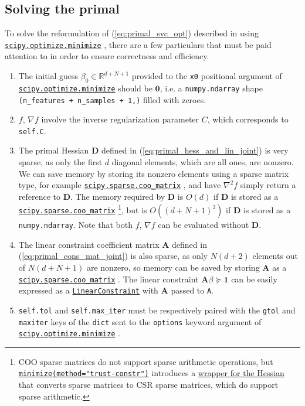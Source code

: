 \documentclass{article}
\numberwithin{equation}{section}
\newcommand{\minimize}{%
    \href{%
        https://docs.scipy.org/doc/scipy/reference/generated/%
        scipy.optimize.minimize.html%
    }{\texttt{scipy.optimize.minimize}}%
}
\newcommand{\minimizetrustconstr}{%
    \href{%
        https://docs.scipy.org/doc/scipy/reference/optimize.%
        minimize-trustconstr.html%
    }{\texttt{minimize(method="trust-constr")}}%
}
\newcommand{\coomatrix}{%
    \href{%
        https://docs.scipy.org/doc/scipy/reference/generated/%
        scipy.sparse.coo_matrix.html%
    }{\texttt{scipy.sparse.coo\_matrix}}%
}
\newcommand{\LinearConstraint}{%
    \href{%
        https://docs.scipy.org/doc/scipy/reference/generated/%
        scipy.optimize.LinearConstraint.html%
    }{\texttt{LinearConstraint}}%
}
\begin{document}
\subsection{Solving the primal}

To solve the reformulation of (\ref{eq:primal_svc_opt}) described in
 using \minimize, there are a few particulars that
must be paid attention to in order to ensure correctness and efficiency.

\medskip

\begin{enumerate}
    \item
    The initial guess $ \beta_0 \in \mathbb{R}^{d + N + 1} $ provided to the
    \texttt{x0} positional argument of \minimize{} should be $ \mathbf{0} $,
    i.e. a \texttt{numpy.ndarray} shape
    \texttt{(n\_features + n\_samples + 1,)} filled with zeroes.

    \item
    $ f $, $ \nabla f $ involve the inverse regularization parameter $ C $,
    which corresponds to \texttt{self.C}.

    \item
    The primal Hessian $ \mathbf{D} $ defined in
    (\ref{eq:primal_hess_and_lin_joint}) is very sparse, as only the first
    $ d $ diagonal elements, which are all ones, are nonzero. We can save
    memory by storing its nonzero elements using a sparse matrix type, for
    example \coomatrix, and have $ \nabla^2 f $ simply return a reference to
    $ \mathbf{D} $. The memory required by $ \mathbf{D} $ is $ O(d) $ if
    $ \mathbf{D} $ is stored as a \coomatrix\footnote{
        COO sparse matrices do not support sparse arithmetic
        operations, but \minimizetrustconstr{} introduces a \href{%
            https://github.com/scipy/scipy/blob/master/scipy/optimize/%
            _differentiable_functions.py\#L162-L185%
        }{wrapper for the Hessian} that converts sparse matrices to CSR
        sparse matrices, which do support sparse arithmetic.
    }, but is $ O((d + N + 1)^2) $ if $ \mathbf{D} $ is stored as a
    \texttt{numpy.ndarray}. Note that both $ f $, $ \nabla f $ can be
    evaluated without $ \mathbf{D} $.

    \item
    The linear constraint coefficient matrix $ \mathbf{A} $ defined in
    (\ref{eq:primal_cons_mat_joint}) is also sparse, as only $ N(d + 2) $
    elements out of $ N(d + N + 1) $ are nonzero, so memory can be saved by
    storing $ \mathbf{A} $ as a \coomatrix. The linear constraint
    $ \mathbf{A}\beta \succeq \mathbf{1} $ can be easily expressed as a
    \LinearConstraint{} with $ \mathbf{A} $ passed to \texttt{A}.

    \item
    \texttt{self.tol} and \texttt{self.max\_iter} must be respectively paired
    with the \texttt{gtol} and \texttt{maxiter} keys of the \texttt{dict} sent
    to the \texttt{options} keyword argument of \minimize.
\end{enumerate}
\end{document}
